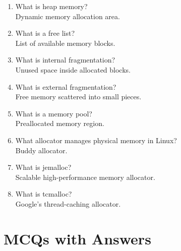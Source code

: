\begin{enumerate}
\item What is heap memory?\\
Dynamic memory allocation area.

\item What is a free list?\\
List of available memory blocks.

\item What is internal fragmentation?\\
Unused space inside allocated blocks.

\item What is external fragmentation?\\
Free memory scattered into small pieces.

\item What is a memory pool?\\
Preallocated memory region.

\item What allocator manages physical memory in Linux?\\
Buddy allocator.

\item What is jemalloc?\\
Scalable high-performance memory allocator.

\item What is tcmalloc?\\
Google's thread-caching allocator.
\end{enumerate}

\section{MCQs with Answers}

